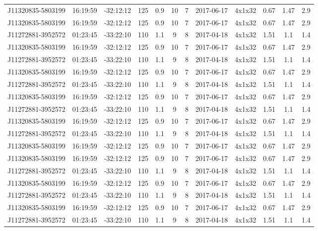 \documentclass[onecolumn]{aa} %
\begin{document}
{\begin{landscape}
\begin{longtable}{cccccccccccc}
J11320835-5803199 & 16:19:59 & -32:12:12 & 125 & 0.9 & 10 & 7 & 2017-06-17 & 4x1x32 & 0.67 & 1.47 & 2.9 \\
J11320835-5803199 & 16:19:59 & -32:12:12 & 125 & 0.9 & 10 & 7 & 2017-06-17 & 4x1x32 & 0.67 & 1.47 & 2.9 \\
J11272881-3952572 & 01:23:45 & -33:22:10 & 110 & 1.1 & 9 & 8 & 2017-04-18 & 4x1x32 & 1.51 & 1.1 & 1.4 \\
J11320835-5803199 & 16:19:59 & -32:12:12 & 125 & 0.9 & 10 & 7 & 2017-06-17 & 4x1x32 & 0.67 & 1.47 & 2.9 \\
J11272881-3952572 & 01:23:45 & -33:22:10 & 110 & 1.1 & 9 & 8 & 2017-04-18 & 4x1x32 & 1.51 & 1.1 & 1.4 \\
J11320835-5803199 & 16:19:59 & -32:12:12 & 125 & 0.9 & 10 & 7 & 2017-06-17 & 4x1x32 & 0.67 & 1.47 & 2.9 \\
J11272881-3952572 & 01:23:45 & -33:22:10 & 110 & 1.1 & 9 & 8 & 2017-04-18 & 4x1x32 & 1.51 & 1.1 & 1.4 \\
J11320835-5803199 & 16:19:59 & -32:12:12 & 125 & 0.9 & 10 & 7 & 2017-06-17 & 4x1x32 & 0.67 & 1.47 & 2.9 \\
J11272881-3952572 & 01:23:45 & -33:22:10 & 110 & 1.1 & 9 & 8 & 2017-04-18 & 4x1x32 & 1.51 & 1.1 & 1.4 \\
J11320835-5803199 & 16:19:59 & -32:12:12 & 125 & 0.9 & 10 & 7 & 2017-06-17 & 4x1x32 & 0.67 & 1.47 & 2.9 \\
J11272881-3952572 & 01:23:45 & -33:22:10 & 110 & 1.1 & 9 & 8 & 2017-04-18 & 4x1x32 & 1.51 & 1.1 & 1.4 \\
J11320835-5803199 & 16:19:59 & -32:12:12 & 125 & 0.9 & 10 & 7 & 2017-06-17 & 4x1x32 & 0.67 & 1.47 & 2.9 \\
J11320835-5803199 & 16:19:59 & -32:12:12 & 125 & 0.9 & 10 & 7 & 2017-06-17 & 4x1x32 & 0.67 & 1.47 & 2.9 \\
J11272881-3952572 & 01:23:45 & -33:22:10 & 110 & 1.1 & 9 & 8 & 2017-04-18 & 4x1x32 & 1.51 & 1.1 & 1.4 \\
J11320835-5803199 & 16:19:59 & -32:12:12 & 125 & 0.9 & 10 & 7 & 2017-06-17 & 4x1x32 & 0.67 & 1.47 & 2.9 \\
J11272881-3952572 & 01:23:45 & -33:22:10 & 110 & 1.1 & 9 & 8 & 2017-04-18 & 4x1x32 & 1.51 & 1.1 & 1.4 \\
J11320835-5803199 & 16:19:59 & -32:12:12 & 125 & 0.9 & 10 & 7 & 2017-06-17 & 4x1x32 & 0.67 & 1.47 & 2.9 \\
J11272881-3952572 & 01:23:45 & -33:22:10 & 110 & 1.1 & 9 & 8 & 2017-04-18 & 4x1x32 & 1.51 & 1.1 & 1.4 \\

\end{longtable}
\end{landscape}}
\end{document}
